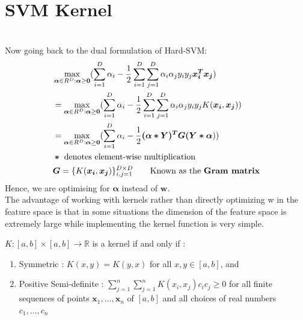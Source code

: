 \documentclass[12pt]{article}
\begin{document}
\section{SVM Kernel} \\
Now going back to the dual formulation of Hard-SVM:
\begin{align*}
   & \max_{\bm{\alpha}\in R^{D}:\bm{\alpha}\ge\bm{0}}(\sum_{i=1}^{D}\alpha_i - \frac{1}{2}\sum_{i=1}^{D}\sum_{j=1}^{D}\alpha_i\alpha_{j}y_{i}y_{j}\bm{x_i^{T}x_j}) \\
   &= \max_{\bm{\alpha}\in R^{D}:\bm{\alpha}\ge\bm{0}}(\sum_{i=1}^{D}\alpha_i - \frac{1}{2}\sum_{i=1}^{D}\sum_{j=1}^{D}\alpha_i\alpha_{j}y_{i}y_{j}K(\bm{x_i}, \bm{x_j}))\\
   &= \max_{\bm{\alpha}\in R^{D}:\bm{\alpha}\ge\bm{0}}(\sum_{i=1}^{D}\alpha_i - \frac{1}{2}\bm{(\alpha * Y)^{T}G{(Y*\alpha}}))        \\
   & \bm{*} \text{ denotes element-wise multiplication} \\
   & \bm{G} = \{K(\bm{x_i}, \bm{x_j})\}_{i,j=1}^{D \times D} \qquad\text{Known as the \textbf{Gram matrix}}
\end{align*}
Hence, we are optimising for $\bm{\alpha}$ instead of $\bm{w}$. \\

The advantage of working with kernels rather than directly optimizing w in the feature space is that in some situations the dimension of the feature space is extremely large while implementing the kernel function is very simple.\\

\begin{theorem}
$K : [ a,b] \times [ a,b] \rightarrow \mathbb{R}$ is a kernel if and only if :
\begin{enumerate} [nolistsep]
    \item Symmetric : $K(x,y) = K(y,x)$ for all $x,y \in [a,b]$, and
    \item Positive Semi-definite : $ \sum_{j=1}^{n} \sum_{j=1}^{n} K(x_i,x_j)c_i c_j \geq 0 $ for all finite sequences of points $\mathbf{x}_1, ..., \mathbf{x}_n$ of $[a, b]$ and all choices of real numbers $c_1, ..., c_n$
\end{enumerate}

\end{theorem}


\nocite{UNderstandingML}
          
                
\end{document}
